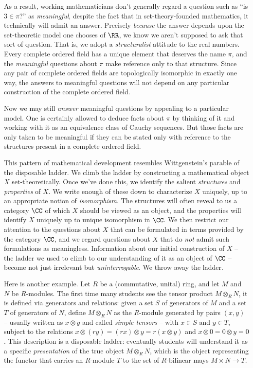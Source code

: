 As a result, working mathematicians don't generally regard a question such as \enquote{is $3 \in \pi$?} as \emph{meaningful},
despite the fact that in set-theory-founded mathematics, it technically will admit an answer.
Precisely \emph{because} the answer depends upon the set-theoretic model one chooses of $\RR$,
we know we aren't supposed to ask that sort of question.
That is, we adopt a \emph{structuralist} attitude to the real numbers.
Every complete ordered field has a unique element that deserves the name $\pi$, and
the \emph{meaningful} questions about $\pi$ make reference only to that structure.
Since any pair of complete ordered fields are topologically isomorphic in exactly one way, the answers to meaningful questions will not depend on any particular construction of the complete ordered field.

Now we may still \emph{answer} meaningful questions by appealing to a particular model. 
One is certainly allowed to deduce facts about $\pi$ by thinking of it and working with it as an equivalence class of Cauchy sequences.
But those facts are only taken to be meaningful if they can be stated only with reference to the structures present in a complete ordered field.

This pattern of mathematical development resembles Wittgenstein's parable of the disposable ladder.
We climb the ladder by constructing a mathematical object $X$ set-theoretically.
Once we've done this, we identify the salient \emph{structures} and \emph{properties} of $X$.
We write enough of these down to characterize $X$ uniquely, up to an appropriate notion of \emph{isomorphism}.
The structures will often reveal to us a category $\CC$ of which $X$ should be viewed as an object, and
the properties will identify $X$ uniquely up to unique isomorphism in $\CC$.
We then restrict our attention to the questions about $X$ that can be formulated in terms provided by the category $\CC$,
and we regard questions about $X$ that do \emph{not} admit such formulations as meaningless.
Information about our initial construction of $X$ -- the ladder we used to climb to our understanding of it as an object of $\CC$ -- become not just irrelevant but \emph{uninterrogable}.
We throw away the ladder.

Here is another example.
Let $R$ be a (commutative, unital) ring, and
let $M$ and $N$ be $R$-modules.
The first time many students see the tensor product $M \otimes_R N$,
it is defined via generators and relations:
given a set $S$ of generators of $M$ and a set $T$ of generators of $N$,
define $M \otimes_R N$ as the $R$-module generated by pairs $(x,y)$ -- usually written as $x \otimes y$ and called \emph{simple tensors} -- with $x \in S$ and $y \in T$,
subject to the relations $x \otimes (ry) = (rx) \otimes y = r(x \otimes y)$ and $x \otimes 0 = 0 \otimes y = 0$.
This description is a disposable ladder:
eventually students will understand it as a specific \emph{presentation} of the true object $M \otimes_R N$, 
which is the object representing the functor that carries an $R$-module $T$ to the set of $R$-bilinear mays $M \times N \to T$.


